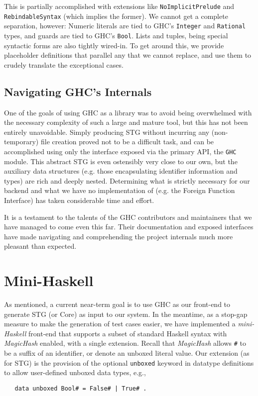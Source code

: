 \documentclass{llncs}
\begin{document}
This is partially accomplished with extensions like
\texttt{NoImplicitPrelude} and \texttt{RebindableSyntax} (which
implies the former).  We cannot get a complete separation, however:
Numeric literals are tied to GHC's \texttt{Integer} and
\texttt{Rational} types, and guards are tied to GHC's \texttt{Bool}.
Lists and tuples, being special syntactic forms are also tightly
wired-in. To get around this, we provide placeholder definitions that
parallel any that we cannot replace, and use them to crudely translate
the exceptional cases.

\subsection{Navigating GHC's Internals}

One of the goals of using GHC as a library was to avoid being
overwhelmed with the necessary complexity of such a large and mature
tool, but this has not been entirely unavoidable.  Simply producing
STG without incurring any (non-temporary) file creation proved not to
be a difficult task, and can be accomplished using only the interface
exposed via the primary API, the \texttt{GHC} module.  This abstract
STG is even ostensibly very close to our own, but the auxiliary data
structures (e.g. those encapsulating identifier information and types)
are rich and deeply nested.  Determining what is strictly necessary
for our backend and what we have no implementation of (e.g. the
Foreign Function Interface) has taken considerable time and effort.

It is a testament to the talents of the GHC contributors and
maintainers that we have managed to come even this far.  Their
documentation and exposed interfaces have made navigating and
comprehending the project internals much more pleasant than expected.



\section{Mini-Haskell}
\label{app:minihaskell}
As mentioned, a current near-term goal is to use GHC as our front-end to
generate STG (or Core) as input to our system.  In the meantime, as a stop-gap
measure to make the generation of test cases easier, we have implemented a
\emph{mini-Haskell} front-end that supports a subset of standard Haskell
syntax with \emph{MagicHash} enabled, with a single extension.  Recall that
\emph{MagicHash} allows \texttt{\#} to be a suffix of an identifier, or denote
an unboxed literal value.  Our extension (as for STG) is the provision of
the optional \texttt{unboxed} keyword in datatype definitions to allow
user-defined unboxed data types, e.g.,
{\footnotesize
\begin{verbatim}
   data unboxed Bool# = False# | True# .
\end{verbatim}}
\end{document}
